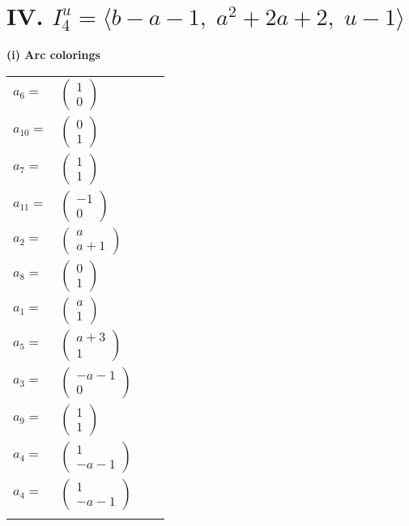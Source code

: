 \documentclass[1p]{elsarticle_modified}
\theoremstyle{definition}
\begin{document}
\centering \section*{IV. $I^u_{4}= \langle b- a-1,\;a^2+2 a+2,\;u-1 \rangle$}
\flushleft \textbf{(i) Arc colorings}\\
\begin{tabular}{m{7pt} m{180pt} m{7pt} m{180pt} }
\flushright $a_{6}=$&$\begin{pmatrix}1\\0\end{pmatrix}$ \\
\flushright $a_{10}=$&$\begin{pmatrix}0\\1\end{pmatrix}$ \\
\flushright $a_{7}=$&$\begin{pmatrix}1\\1\end{pmatrix}$ \\
\flushright $a_{11}=$&$\begin{pmatrix}-1\\0\end{pmatrix}$ \\
\flushright $a_{2}=$&$\begin{pmatrix}a\\a+1\end{pmatrix}$ \\
\flushright $a_{8}=$&$\begin{pmatrix}0\\1\end{pmatrix}$ \\
\flushright $a_{1}=$&$\begin{pmatrix}a\\1\end{pmatrix}$ \\
\flushright $a_{5}=$&$\begin{pmatrix}a+3\\1\end{pmatrix}$ \\
\flushright $a_{3}=$&$\begin{pmatrix}- a-1\\0\end{pmatrix}$ \\
\flushright $a_{9}=$&$\begin{pmatrix}1\\1\end{pmatrix}$ \\
\flushright $a_{4}=$&$\begin{pmatrix}1\\- a-1\end{pmatrix}$\\ \flushright $a_{4}=$&$\begin{pmatrix}1\\- a-1\end{pmatrix}$\\&\end{tabular}
\end{document}
